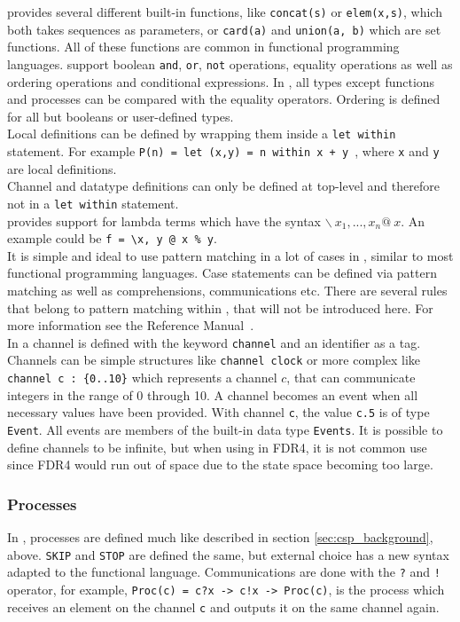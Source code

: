 \cspm{} provides several different built-in functions, like \texttt{concat(s)} or \texttt{elem(x,s)}, which both takes sequences as parameters, or \texttt{card(a)} and \texttt{union(a, b)} which are set functions. All of these functions are common in functional programming languages. \cspm{} support boolean \texttt{and}, \texttt{or}, \texttt{not} operations, equality operations as well as ordering operations and conditional expressions. In \cspm, all types except functions and processes can be compared with the equality operators. Ordering is defined for all but booleans or user-defined types. \\

Local definitions can be defined by wrapping them inside a \texttt{let within} statement. For example \texttt{P(n) = let (x,y) = n within x + y }, where \texttt{x} and \texttt{y} are local definitions.\\ Channel and datatype definitions can only be defined at top-level and therefore not in a \texttt{let within} statement. \\
\cspm{} provides support for lambda terms which have the syntax $\backslash \  x_1,...,x_n @\ x$. An example could be \texttt{f = \textbackslash x, y @ x \% y}. \\
It is simple and ideal to use pattern matching in a lot of cases in \cspm, similar to most functional programming languages. Case statements can be defined via pattern matching as well as comprehensions, communications etc. There are several rules that belong to pattern matching within \cspm{}, that will not be introduced here. For more information see the \cspm{} Reference Manual~\cite{Scattergood2011}.\\

In \cspm{} a channel is defined with the keyword \texttt{channel} and an identifier as a tag. Channels can be simple structures like \texttt{channel clock} or more complex like \texttt{channel c : \{0..10\}} which represents a channel $c$, that can communicate integers in the range of 0 through 10. A channel becomes an event when all necessary values have been provided. With channel \texttt{c}, the value \texttt{c.5} is of type \texttt{Event}. All events are members of the built-in data type \texttt{Events}. It is possible to define channels to be infinite, but when using \cspm{} in FDR4, it is not common use since FDR4 would run out of space due to the state space becoming too large.

\subsubsection{\cspm{} Processes}
In \cspm{}, processes are defined much like described in section \ref{sec:csp_background}, above. \texttt{SKIP} and \texttt{STOP} are defined the same, but external choice has a new syntax adapted to the functional language. Communications are done with the \texttt{?} and \texttt{!} operator, for example, \texttt{Proc(c) = c?x -> c!x -> Proc(c)}, is the process which receives an element on the channel \texttt{c} and outputs it on the same channel again.

